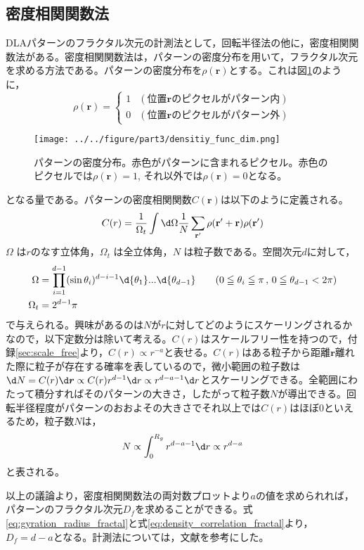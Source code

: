 \documentclass[autodetect-engine,dvi=dvipdfmx,a4paper,ja=standard,oneside,openany,11pt]{bxjsbook}
\begin{document}
\subsection{密度相関関数法}
\label{sec:density_correlation}
DLAパターンのフラクタル次元の計測法として，回転半径法の他に，密度相関関数法がある。密度相関関数法は，パターンの密度分布を用いて，フラクタル次元を求める方法である。パターンの密度分布を$\rho(\bm{r})$とする。これは図\ref{fig:density_func_dif}のように，
\begin{equation}
  \rho(\bm{r})=
  \begin{cases}
    1 & (\mathrm{位置}\bm{r}\mathrm{のピクセルがパターン内}) \\
    0 & (\mathrm{位置}\bm{r}\mathrm{のピクセルがパターン外})
  \end{cases}
  \label{eq:density_distribution}
\end{equation}
\begin{figure}[htbp]
  \centering
  \texttt{[image: ../../figure/part3/densitiy\_func\_dim.png]}
  \caption{パターンの密度分布。赤色がパターンに含まれるピクセル。赤色のピクセルでは$\rho(\bm{r})=1$, それ以外では$\rho(\bm{r})=0$となる。}
  \label{fig:density_func_dif}
\end{figure}
となる量である。パターンの密度相関関数$C(\bm{r})$は以下のように定義される。
\begin{equation}
  C(r)=\frac{1}{\Omega_t}\int \d\Omega \frac{1}{N}\sum_{{\bf{r'}}}\rho({\bf r'+ r})\rho({\bf {r'}})
  \label{eq:density_correlation}
\end{equation}
$\Omega$ は$r$のなす立体角，$\Omega_t$ は全立体角，$N$ は粒子数である。空間次元$d$に対して，
\begin{equation}
  \begin{aligned}
    \Omega   & =\prod^{d-1}_{i=1} (\sin\theta_i)^{d-i-1} \d{\theta_1}...\d{\theta_{d-1}} \qquad(0\leqq \theta_i\leqq \pi\,,\,0\leqq\theta_{d-1}<2\pi) \\
    \Omega_t & =2^{d-1}\pi
  \end{aligned}
  \label{eq:omega}
\end{equation}
で与えられる。興味があるのは$N$が$r$に対してどのようにスケーリングされるかなので，以下定数分は除いて考える。$C(r)$はスケールフリー性を持つので，付録\ref{sec:scale_free}より，$C(r)\propto r^{-a}$と表せる。$C(r)$はある粒子から距離$\bm{r}$離れた際に粒子が存在する確率を表しているので，微小範囲の粒子数は$\d N=C(r)\d \bm{r}\propto C(r)r^{d-1}\d r\propto r^{d-a-1} \d r $とスケーリングできる。全範囲にわたって積分すればそのパターンの大きさ，したがって粒子数$N$が導出できる。回転半径程度がパターンのおおよその大きさでそれ以上では$C(r)$はほぼ0といえるため，粒子数$N$は，
\begin{equation}
  N\propto \int_{0}^{R_g} r^{d-a-1} \d r\propto r^{d-a}
  \label{eq:density_correlation_fractal}
\end{equation}
と表される。

以上の議論より，密度相関関数法の両対数プロットより$a$の値を求められれば，パターンのフラクタル次元$D_f$を求めることができる。式\ref{eq:gyration_radius_fractal}と式\ref{eq:density_correlation_fractal}より，$D_f=d-a$となる。計測法については，文献\cite{フラクタルの物理Ⅰ}を参考にした。
\ifdraft{
  
  
}{}
\end{document}
